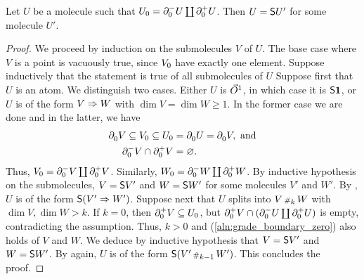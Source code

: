 \begin{lem} \label{lem:has_two_point_is_susp}
    Let \( U \) be a molecule such that \( \gr{0}{U} = \bd{0}{-} U \coprod \bd{0}{+} U \).
    Then \( U = \sus{U'} \) for some molecule \( U' \).
\end{lem}
\begin{proof}
    We proceed by induction on the submolecules \( V \) of \( U \).
    The base case where \( V \) is a point is vacuously true, since \( \gr{0}{V} \) have exactly one element.
    Suppose inductively that the statement is true of all submolecules of \( U \)
    Suppose first that \( U \) is an atom.
    We distinguish two cases.
    Either \( U \) is \( \dglobe{1} \), in which case it is \( \sus{\pt} \), or \( U \) is of the form \( V \celto W \) with \( \dim V = \dim W \geq 1 \).
    In the former case we are done and in the latter, we have
    \begin{align} 
         \bd{0}{} V \subseteq \gr{0}{V} \subseteq \gr{0}{U} &= \bd{0}{} U = \bd{0}{} V, \text{ and} \nonumber\\
         \bd{0}{-} V \cap \bd{0}{+} V &= \varnothing \label{aln:grade_boundary_zero}.
    \end{align}
    Thus, \( \gr{0}{V} = \bd{0}{-} V \coprod \bd{0}{+} V\).
    Similarly, \( \gr{0}{W} = \bd{0}{-} W \coprod \bd{0}{+} W \).
    By inductive hypothesis on the submolecules, \( V = \sus{V'} \) and \( W = \sus{W'} \) for some molecules \( V' \) and \( W' \).
    By \cite[Proposition 7.3.16]{hadzihasanovic2024combinatorics}, \( U \) is of the form \( \sus{(V' \celto W')} \).
    Suppose next that \( U \) splits into \( V \cp{k} W \) with \( \dim V, \dim W > k \).
    If \( k = 0 \), then \( \bd{0}{+} V \subseteq \gr{0}{U} \), but \( \bd{0}{+} V \cap (\bd{0}{-} U \coprod \bd{0}{+} U) \) is empty, contradicting the assumption.
    Thus, \( k > 0 \) and (\ref{aln:grade_boundary_zero}) also holds of \( V \) and \( W \).
    We deduce by inductive hypothesis that \( V = \sus{V'} \) and \( W = \sus{W'} \).
    By \cite[Proposition 7.3.16]{hadzihasanovic2024combinatorics} again, \( U \) is of the form \( \sus{(V' \cp{k - 1} W')} \).
    This concludes the proof.
\end{proof}

